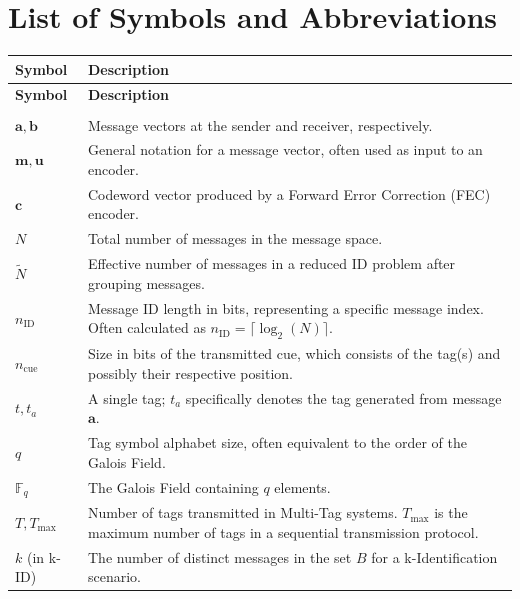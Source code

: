 \documentclass[english,BCOR=4mm,cdfont=false]{tudscrreprt} %
\begin{document}
\newpage

\chapter*{List of Symbols and Abbreviations}

\begin{longtable}{@{}p{} p{}@{}}
\toprule
\textbf{Symbol} & \textbf{Description} \\
\midrule
\endfirsthead
\toprule
\textbf{Symbol} & \textbf{Description} \\
\midrule
\endhead
\bottomrule
\endfoot
\bottomrule
\endlastfoot

\multicolumn{2}{l}{\textbf{General Parameters}} \\ \addlinespace
$\boldsymbol{a}, \boldsymbol{b}$ & Message vectors at the sender and receiver, respectively. \\
$\boldsymbol{m}, \boldsymbol{u}$ & General notation for a message vector, often used as input to an encoder. \\
$\mathbf{c}$                 & Codeword vector produced by a Forward Error Correction (FEC) encoder. \\
$N$                          & Total number of messages in the message space. \\
$\tilde{N}$                  & Effective number of messages in a reduced ID problem after grouping messages. \\
$n_\text{ID}$                & Message ID length in bits, representing a specific message index. Often calculated as $n_\text{ID} = \lceil \log_2(N) \rceil$. \\
$n_\text{cue}$               & Size in bits of the transmitted cue, which consists of the tag(s) and possibly their respective position. \\
$t, t_a$                     & A single tag; $t_a$ specifically denotes the tag generated from message $\boldsymbol{a}$. \\
$q$                          & Tag symbol alphabet size, often equivalent to the order of the Galois Field. \\
$\mathbb{F}_q$               & The Galois Field containing $q$ elements. \\
$T, T_\text{max}$           & Number of tags transmitted in Multi-Tag systems. $T_\text{max}$ is the maximum number of tags in a sequential transmission protocol. \\
$k$ (in k-ID)               & The number of distinct messages in the set $B$ for a k-Identification scenario. \\

\end{longtable}
\end{document}

